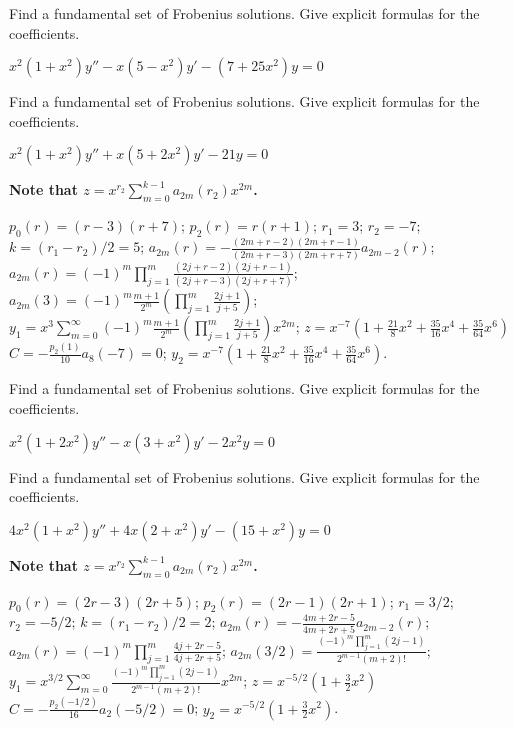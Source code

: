 \documentclass{ximera}
\begin{document}
\begin{problem}\label{exer:7.7.37}
Find
a fundamental set  of Frobenius solutions. Give explicit formulas for
the coefficients.

$x^2(1+x^2)y''-x(5-x^2)y'-(7+25x^2)y=0$
\end{problem}

\begin{problem}\label{exer:7.7.38}
Find
a fundamental set  of Frobenius solutions. Give explicit formulas for
the coefficients.

$x^2(1+x^2)y''+x(5+2x^2)y'-21y=0$

\begin{solution}
    \textbf{Note that $z=x^{r_2}\sum_{m=0}^{k-1}a_{2m}(r_2)x^{2m}$.}

    $p_0(r)=(r-3)(r+7)$;
$p_2(r)=r(r+1)$;
$r_1=3$; $r_2=-7$; $k=(r_1-r_2)/2=5$;
$a_{2m}(r)=-\frac{(2m+r-2)(2m+r-1)}{(2m+r-3)(2m+r+7)}
a_{2m-2}(r)$;
$a_{2m}(r)=(-1)^m\prod_{j=1}^m\frac{(2j+r-2)(2j+r-1)}{(2j+r-3)(2j+r+7)}$;
$a_{2m}(3)=(-1)^m\frac{m+1}{2^m}\left(\prod_{j=1}^m\frac{2j+1}{
j+5}\right)$;
$y_1=x^3\sum_{m=0}^\infty(-1)^m\frac{m+1}{2^m}\left(\prod_{j=1}^m\frac{2j+1}{
j+5}\right)x^{2m}$;
$z=x^{-7}\left(1+\frac{21}{8}x^2+\frac{35}{16}x^4+\frac{35}{64}x^6\right)$
$C=-\frac{p_2(1)}{10}a_8(-7)=0$;
$y_2=x^{-7}\left(1+\frac{21}{8}x^2+\frac{35}{16}x^4+\frac{35}{64}x^6\right)$.
\end{solution}
\end{problem}

\begin{problem}\label{exer:7.7.39}
Find
a fundamental set  of Frobenius solutions. Give explicit formulas for
the coefficients.

$x^2(1+2x^2)y''-x(3+x^2)y'-2x^2y=0$
\end{problem}

\begin{problem}\label{exer:7.7.40}
Find
a fundamental set  of Frobenius solutions. Give explicit formulas for
the coefficients.

$4x^2(1+x^2)y''+4x(2+x^2)y'-(15+x^2)y=0$

\begin{solution}
    \textbf{Note that $z=x^{r_2}\sum_{m=0}^{k-1}a_{2m}(r_2)x^{2m}$.}

    $p_0(r)=(2r-3)(2r+5)$;
$p_2(r)=(2r-1)(2r+1)$;
$r_1=3/2$; $r_2=-5/2$; $k=(r_1-r_2)/2=2$;
$a_{2m}(r)=-\frac{4m+2r-5}{4m+2r+5}
a_{2m-2}(r)$;
 $a_{2m}(r)=(-1)^m\prod_{j=1}^m\frac{4j+2r-5}{4j+2r+5}$;
$a_{2m}(3/2)=\frac{(-1)^m \prod_{j=1}^m(2j-1)}{2^{m-1}(m+2)!}$;
$y_1=x^{3/2}\sum_{m=0}^\infty\frac{(-1)^m
\prod_{j=1}^m(2j-1)}{2^{m-1}(m+2)!}x^{2m}$;
$z=x^{-5/2}\left(1+\frac{3}{2}x^2\right)$
$C=-\frac{p_2(-1/2)}{16}a_2(-5/2)=0$;
$y_2=x^{-5/2}\left(1+\frac{3}{2}x^2\right)$.
\end{solution}
\end{problem}
\end{document}
